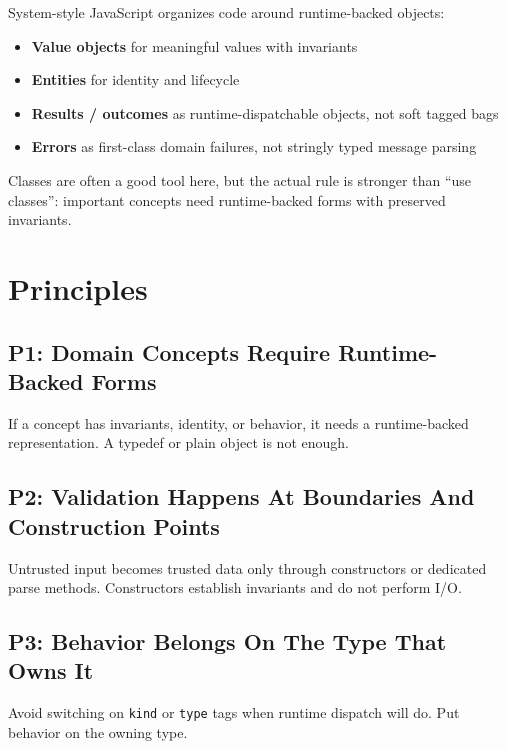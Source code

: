 System-style JavaScript organizes code around runtime-backed objects:

\begin{itemize}
\tightlist
\item
  \textbf{Value objects} for meaningful values with invariants
\item
  \textbf{Entities} for identity and lifecycle
\item
  \textbf{Results / outcomes} as runtime-dispatchable objects, not soft tagged bags
\item
  \textbf{Errors} as first-class domain failures, not stringly typed message parsing
\end{itemize}

Classes are often a good tool here, but the actual rule is stronger than ``use classes'': important concepts need runtime-backed forms with preserved invariants.

\section{Principles}\label{record-060-principles}

\subsection{P1: Domain Concepts Require Runtime-Backed Forms}\label{record-060-p1-domain-concepts-require-runtime-backed-forms}

If a concept has invariants, identity, or behavior, it needs a runtime-backed representation. A typedef or plain object is not enough.

\subsection{P2: Validation Happens At Boundaries And Construction Points}\label{record-060-p2-validation-happens-at-boundaries-and-construction-points}

Untrusted input becomes trusted data only through constructors or dedicated parse methods. Constructors establish invariants and do not perform I/O.

\subsection{P3: Behavior Belongs On The Type That Owns It}\label{record-060-p3-behavior-belongs-on-the-type-that-owns-it}

Avoid switching on \texttt{k\allowbreak{}i\allowbreak{}n\allowbreak{}d} or \texttt{t\allowbreak{}y\allowbreak{}p\allowbreak{}e} tags when runtime dispatch will do. Put behavior on the owning type.


